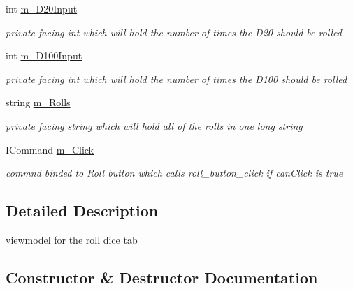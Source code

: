 \begin{DoxyCompactItemize}
int \mbox{\hyperlink{class_dungeons__n___dragons___manager_1_1_viewmodels_1_1_dice_roll_tab_viewmodel_a2c970a5c752ba682dfba0ca565de5f31}{m\+\_\+\+D20\+Input}}
\begin{DoxyCompactList}\small\item\em private facing int which will hold the number of times the D20 should be rolled \end{DoxyCompactList}\item 
int \mbox{\hyperlink{class_dungeons__n___dragons___manager_1_1_viewmodels_1_1_dice_roll_tab_viewmodel_aac206167e38a9a5ef19cf9081e1d02db}{m\+\_\+\+D100\+Input}}
\begin{DoxyCompactList}\small\item\em private facing int which will hold the number of times the D100 should be rolled \end{DoxyCompactList}\item 
string \mbox{\hyperlink{class_dungeons__n___dragons___manager_1_1_viewmodels_1_1_dice_roll_tab_viewmodel_a8a16bd13f2e0a2f47efc1f9aaae3d4a1}{m\+\_\+\+Rolls}}
\begin{DoxyCompactList}\small\item\em private facing string which will hold all of the rolls in one long string \end{DoxyCompactList}\item 
I\+Command \mbox{\hyperlink{class_dungeons__n___dragons___manager_1_1_viewmodels_1_1_dice_roll_tab_viewmodel_a7d041f831d74a12f5bfaffeffab37464}{m\+\_\+\+Click}}
\begin{DoxyCompactList}\small\item\em commnd binded to Roll button which calls roll\+\_\+button\+\_\+click if can\+Click is true \end{DoxyCompactList}\end{DoxyCompactItemize}


\subsection{Detailed Description}
viewmodel for the roll dice tab 



\subsection{Constructor \& Destructor Documentation}
\mbox{\label{class_dungeons__n___dragons___manager_1_1_viewmodels_1_1_dice_roll_tab_viewmodel_ab6129757ad68b42d45e024b902561508}} 

